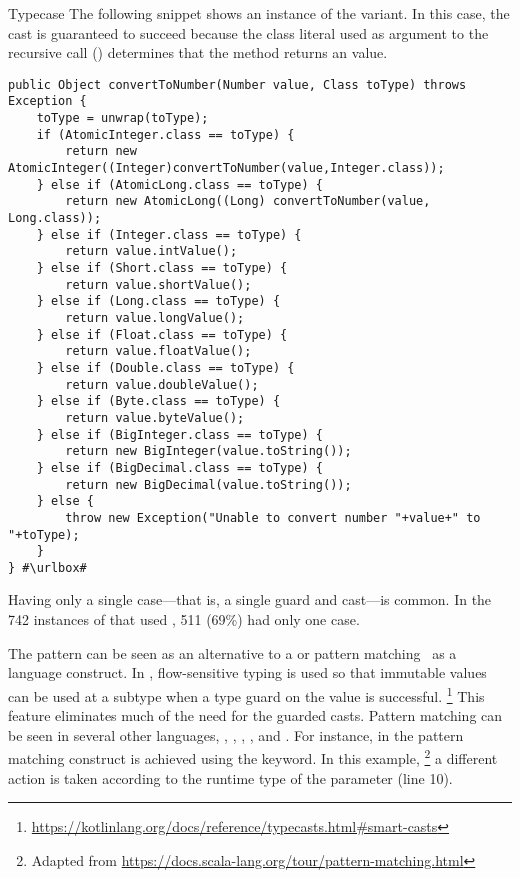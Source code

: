\begin{pattern}{Typecase}
The following snippet shows an instance of the  variant. 
In this case, the cast is guaranteed to succeed because the class literal used as argument to the recursive call () determines that the method returns an  value.
\def\urlvar{http://bit.ly/apache_karaf_2HE55gE}
\begin{verbatim}
public Object convertToNumber(Number value, Class toType) throws Exception {
    toType = unwrap(toType);
    if (AtomicInteger.class == toType) {
        return new AtomicInteger((Integer)convertToNumber(value,Integer.class));
    } else if (AtomicLong.class == toType) {
        return new AtomicLong((Long) convertToNumber(value, Long.class));
    } else if (Integer.class == toType) {
        return value.intValue();
    } else if (Short.class == toType) {
        return value.shortValue();
    } else if (Long.class == toType) {
        return value.longValue();
    } else if (Float.class == toType) {
        return value.floatValue();
    } else if (Double.class == toType) {
        return value.doubleValue();
    } else if (Byte.class == toType) {
        return value.byteValue();
    } else if (BigInteger.class == toType) {
        return new BigInteger(value.toString());
    } else if (BigDecimal.class == toType) {
        return new BigDecimal(value.toString());
    } else {
        throw new Exception("Unable to convert number "+value+" to "+toType);
    }
} #\urlbox#
\end{verbatim}


\issues{}
Having only a single case---that is, a single guard and cast---is common.
In the 742 instances of \thisp{} that used , 511
(69\%) had only one case.

The \thisp{} pattern can be seen as an \adhoc{} alternative to a
 or pattern matching~\citep{milnerProposalStandardML1984} as a
language construct.
In \kotlin{}, flow-sensitive typing is used so that immutable values can be
used at a subtype when a type guard on the value is successful.%
\footnote{\url{https://kotlinlang.org/docs/reference/typecasts.html\#smart-casts}}
This feature eliminates much of the need for the guarded casts.
Pattern matching can be seen in several other languages, \eg, \ml{}, \scala{}, \csharp{}, and \haskell{}.
For instance, in \scala{} the pattern matching construct is achieved using the  keyword.
In this example,%
\footnote{Adapted from \url{https://docs.scala-lang.org/tour/pattern-matching.html}}
a different action is taken according to the runtime type of the parameter  (line 10).


\end{pattern}
